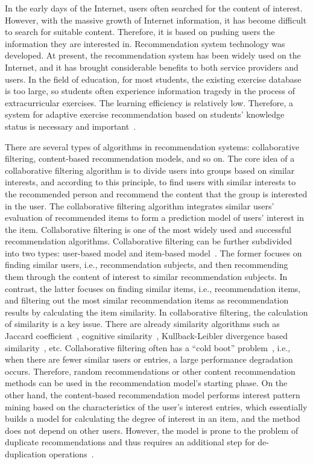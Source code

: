 In the early days of the Internet, users often searched for the content of interest. However, with the massive growth of Internet information, it has become difficult to search for suitable content. Therefore, it is based on pushing users the information they are interested in. Recommendation system technology was developed. At present, the recommendation system has been widely used on the Internet, and it has brought considerable benefits to both service providers and users. In the field of education, for most students, the existing exercise database is too large, so students often experience information tragedy in the process of extracurricular exercises. The learning efficiency is relatively low. Therefore, a system for adaptive exercise recommendation based on students' knowledge status is necessary and important~\cite{huang2019exploring}.

There are several types of algorithms in recommendation systems: collaborative filtering, content-based recommendation models, and so on. The core idea of a collaborative filtering algorithm is to divide users into groups based on similar interests, and according to this principle, to find users with similar interests to the recommended person and recommend the content that the group is interested in the user. The collaborative filtering algorithm integrates similar users' evaluation of recommended items to form a prediction model of users' interest in the item. Collaborative filtering is one of the most widely used and successful recommendation algorithms. Collaborative filtering can be further subdivided into two types: user-based model and item-based model~\cite{Juan_2019}. The former focuses on finding similar users, i.e., recommendation subjects, and then recommending them through the content of interest to similar recommendation subjects. In contrast, the latter focuses on finding similar items, i.e., recommendation items, and filtering out the most similar recommendation items as recommendation results by calculating the item similarity. In collaborative filtering, the calculation of similarity is a key issue. There are already similarity algorithms such as Jaccard coefficient~\cite{leeJ2020accardcf}, cognitive similarity~\cite{cogsim2020}, Kullback-Leibler divergence based similarity~\cite{kldsim2019}, etc. Collaborative filtering often has a ``cold boot'' problem~\cite{fu2019collaborative}, i.e., when there are fewer similar users or entries, a large performance degradation occurs. Therefore, random recommendations or other content recommendation methods can be used in the recommendation model's starting phase. On the other hand, the content-based recommendation model performs interest pattern mining based on the characteristics of the user's interest entries, which essentially builds a model for calculating the degree of interest in an item, and the method does not depend on other users. However, the model is prone to the problem of duplicate recommendations and thus requires an additional step for de-duplication operations~\cite{gopalan2014content}.

